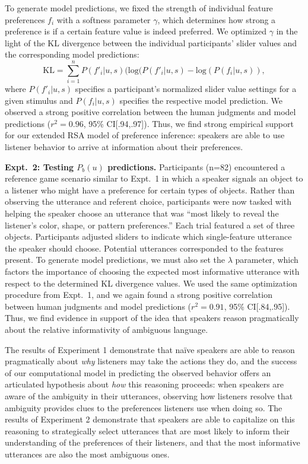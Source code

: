 \documentclass[12pt]{article}
\begin{document}
To generate model predictions, we fixed the strength of individual feature preferences $f_i$ with a softness parameter $\gamma$, which determines how strong a preference is if a certain feature value is indeed preferred. We optimized $\gamma$ in the light of the KL divergence between the individual participants' slider values and the corresponding model predictions:
$$\textrm{KL} = \sum_{i=1}^{n} P(f'_i|u,s) (\textrm {log} (P(f'_i|u,s) - \textrm {log} (P(f_i|u,s)),$$
where $P(f'_i|u,s)$ specifies a participant's normalized slider value settings for a given stimulus and $P(f_i|u,s)$ specifies the respective model prediction. We observed a strong positive correlation between the human judgments and model predictions ($r^2 = 0.96$, 95\% CI[.94,.97]). Thus, we find strong empirical support for our extended RSA model of preference inference: speakers are able to use listener behavior to arrive at information about their preferences.

\noindent \textbf{Expt.~2: Testing $P_{b}(u)$ predictions.} Participants (n=82) encountered a reference game scenario similar to Expt.~1 in which a speaker signals an object to a listener who might have a preference for certain types of objects. Rather than observing the utterance and referent choice, participants were now tasked with helping the speaker choose an utterance that was ``most likely to reveal the listener's color, shape, or pattern preferences.'' Each trial featured a set of three objects. Participants adjusted sliders to indicate which single-feature utterance the speaker should choose. Potential utterances corresponded to the features present. To generate model predictions, we must also set the $\lambda$ parameter, which factors the importance of choosing the expected most informative utterance with respect to the determined KL divergence values. We used the same optimization procedure from Expt.~1, and we again found a strong positive correlation between human judgments and model predictions ($r^2 = 0.91$, 95\% CI[.84,.95]). Thus, we find evidence in support of the idea that speakers reason pragmatically about the relative informativity of ambiguous language.

The results of Experiment 1 demonstrate that na\"ive speakers are able to reason pragmatically about \emph{why} listeners may take the actions they do, and the success of our computational model in predicting the observed behavior offers an articulated hypothesis about \emph{how} this reasoning proceeds: when speakers are aware of the ambiguity in their utterances, observing how listeners resolve that ambiguity provides clues to the preferences listeners use when doing so.
The results of Experiment 2 demonstrate that speakers are able to capitalize on this reasoning to strategically select utterances that are most likely to inform their understanding of the preferences of their listeners, and that the most informative utterances are also the most ambiguous ones.
\end{document}
